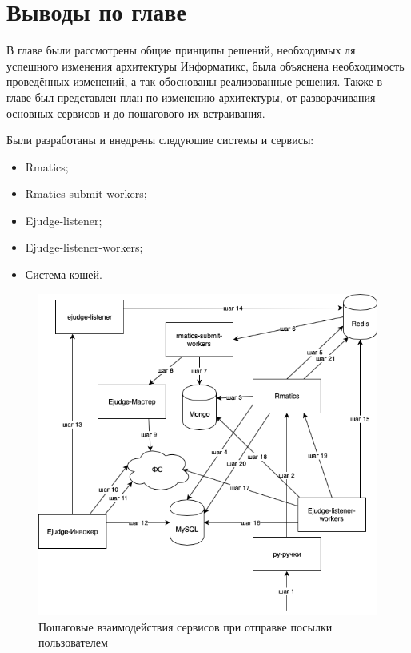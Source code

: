 \section{Выводы по главе}

В главе были рассмотрены общие принципы решений, необходимых ля успешного изменения архитектуры Информатикс, 
была объяснена необходимость проведённых изменений, 
а так обоснованы реализованные решения.
Также в главе был представлен план по изменению архитектуры,
от разворачивания основных сервисов и до пошагового их встраивания.

Были разработаны и внедрены следующие системы и сервисы:
\begin{itemize}
    \item Rmatics;
    \item Rmatics-submit-workers;
    \item Ejudge-listener;
    \item Ejudge-listener-workers;
    \item Система кэшей.
\end{itemize}

\begin{figure}
  \centering
  \includegraphics[width=\textwidth]{figures/send_submission.png}
  \caption{Пошаговые взаимодействия сервисов при отправке посылки пользователем}
  \label{fig:send_submission}
\end{figure}


